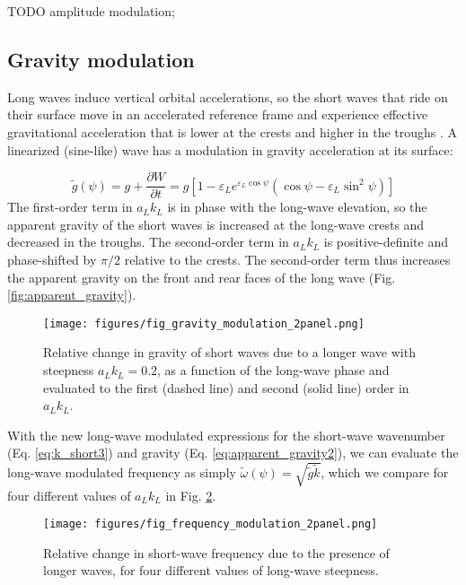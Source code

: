\documentclass[draft]{agujournal2019}
\begin{document}
TODO amplitude modulation;

\subsection{Gravity modulation}
\label{subsection:gravity_modulation}

Long waves induce vertical orbital accelerations, so the short
waves that ride on their surface move in an accelerated reference frame and
experience effective gravitational acceleration that is lower at the crests and
higher in the troughs \cite{longuet1986eulerian,longuet1987propagation}.
A linearized (sine-like) wave has a modulation in gravity acceleration at its
surface:

\begin{equation}
\label{eq:effective_gravity}
\widetilde{g}(\psi) = g + \dfrac{\partial W}{\partial t} = g \left[
  1 - \varepsilon_L e^{\varepsilon_L \cos{\psi}} \left(
    \cos{\psi} - \varepsilon_L \sin^2{\psi}
  \right)
\right]
\end{equation}
The first-order term in $a_L k_L$ is in phase with the long-wave elevation,
so the apparent gravity of the short waves is increased at the long-wave crests
and decreased in the troughs.
The second-order term in $a_L k_L$ is positive-definite and phase-shifted by
$\pi/2$ relative to the crests.
The second-order term thus increases the apparent gravity on the front and rear
faces of the long wave (Fig. \ref{fig:apparent_gravity}).

\begin{figure}[h]
\label{fig:gravity_modulation}
\centering
\texttt{[image: figures/fig\_gravity\_modulation\_2panel.png]}
\caption{
  Relative change in gravity of short waves due to a longer wave with steepness $a_L k_L = 0.2$,
  as a function of the long-wave phase and evaluated to the first (dashed line) and second (solid line) order in $a_L k_L$.
}
\end{figure}

With the new long-wave modulated expressions for the short-wave wavenumber
(Eq. \ref{eq:k_short3}) and gravity (Eq. \ref{eq:apparent_gravity2}), we can
evaluate the long-wave modulated frequency as simply
$\widetilde{\omega}(\psi) = \sqrt{\widetilde{g} \widetilde{k}}$, which we compare
for four different values of $a_L k_L$ in Fig. \ref{fig:frequency_modulation}.

\begin{figure}[h]
\label{fig:frequency_modulation}
\centering
\texttt{[image: figures/fig\_frequency\_modulation\_2panel.png]}
\caption{
  Relative change in short-wave frequency due to the presence of longer
  waves, for four different values of long-wave steepness.
}
\end{figure}
\end{document}
